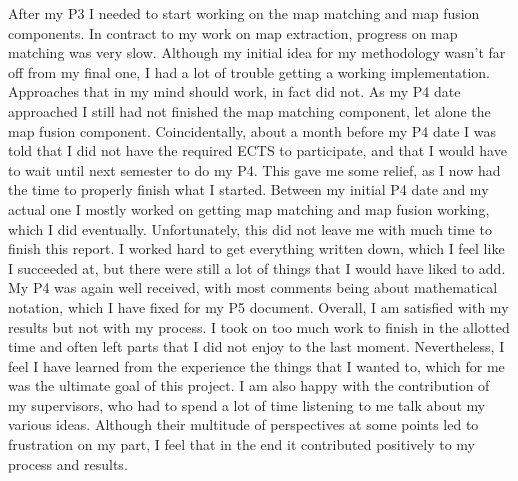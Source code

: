 After my P3 I needed to start working on the map matching and map fusion components. In contract to my work on map extraction, progress on map matching was very slow. Although my initial idea for my methodology wasn't far off from my final one, I had a lot of trouble getting a working implementation. Approaches that in my mind should work, in fact did not. As my P4 date approached I still had not finished the map matching component, let alone the map fusion component. Coincidentally, about a month before my P4 date I was told that I did not have the required ECTS to participate, and that I would have to wait until next semester to do my P4. This gave me some relief, as I now had the time to properly finish what I started. Between my initial P4 date and my actual one I mostly worked on getting map matching and map fusion working, which I did eventually. Unfortunately, this did not leave me with much time to finish this report. I worked hard to get everything written down, which I feel like I succeeded at, but there were still a lot of things that I would have liked to add. My P4 was again well received, with most comments being about mathematical notation, which I have fixed for my P5 document. 
Overall, I am satisfied with my results but not with my process. I took on too much work to finish in the allotted time and often left parts that I did not enjoy to the last moment. Nevertheless, I feel I have learned from the experience the things that I wanted to, which for me was the ultimate goal of this project. I am also happy with the contribution of my supervisors, who had to spend a lot of time listening to me talk about my various ideas. Although their multitude of perspectives at some points led to frustration on my part, I feel that in the end it contributed positively to my process and results.